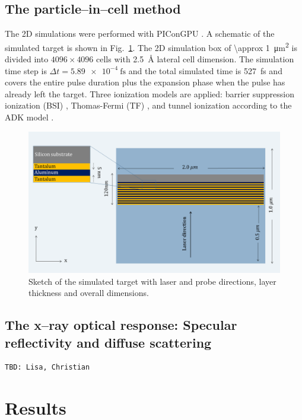 \documentclass[preprint, 12pt]{elsarticle}
\begin{document}
\subsection{The particle--in--cell method\label{sec:PIC}}
The 2D simulations were performed with PIConGPU \cite{Bussmann2013}
. A
schematic of the simulated target is shown in Fig.~\ref{fig:simulation_setup}.
The 2D simulation box of \SI{\approx 1}{\square\micro\meter} is divided into $4096 \times 4096$ cells with
\SI{2.5}{\angstrom} lateral cell
dimension.  The simulation time step is ${\Delta}t=\SI{5.89e-4}{\fs}$
and the total simulated time is \SI{527}{\fs} and covers the entire pulse
duration plus the expansion phase when the pulse has already left the target.
Three ionization models are applied: barrier suppression ionization (BSI)
\cite{TBD}, Thomas-Fermi (TF) \cite{TBD}, and tunnel ionization according to the ADK model \cite{TBD}.
%
\begin{figure}[ht]
  \centering%
  \includegraphics[width=0.8\linewidth]{figures/P_2.png}
  \caption{Sketch of the simulated target with laser and probe directions, layer
    thickness and overall dimensions.}
  \label{fig:simulation_setup}
\end{figure}
%
\subsection{The x--ray optical response: Specular reflectivity and diffuse scattering\label{sec:response}}
%
\begin{verbatim}
TBD: Lisa, Christian
\end{verbatim}
%
\lipsum[1]
%
\section{Results\label{sec:Results}}
\end{document}

